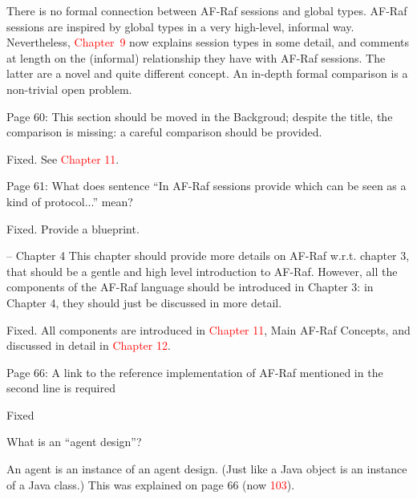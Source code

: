 \documentclass{article}
\newcommand*\R[1]{\textcolor{red}{#1}} %
\newenvironment{them}{\noindent\begingroup\color{blue}}{\endgroup\par}
\begin{document}
There is no formal connection between AF-Raf sessions and global types.
AF-Raf sessions are inspired by global types in a very high-level,
  informal way.
Nevertheless,
  \R{Chapter~9} now explains session types in some detail,
  and comments at length on the (informal) relationship they have with
    AF-Raf sessions.
The latter are a novel and quite different concept.
An in-depth formal comparison is a non-trivial open problem.


\begin{them}

Page 60:
This section should be moved in the Backgroud; despite the title, the
comparison is missing: a careful comparison should be provided.

\end{them}
Fixed. See \R{Chapter 11}.

\begin{them}

Page 61:
What does sentence “In AF-Raf sessions provide which can be seen as a kind of
protocol...” mean?

\end{them}
Fixed. Provide a blueprint.

\begin{them}

-- Chapter 4
This chapter should provide more details on AF-Raf w.r.t. chapter 3, that
should be a gentle and high level introduction to AF-Raf. However, all the
components of the AF-Raf language should be introduced in Chapter 3: in Chapter
4, they should just be discussed in more detail.

\end{them}
Fixed. All components are introduced in \R{Chapter 11}, Main AF-Raf Concepts, and discussed in detail in \R{Chapter 12}.

\begin{them}

Page 66:
A link to the reference implementation of AF-Raf mentioned in the second line
is required

\end{them}
Fixed

\begin{them}

What is an ``agent design''? 

\end{them}

An agent is an instance of an agent design.
(Just like a Java object is an instance of a Java class.)
This was explained on page 66 (now \R{103}).
\end{document}
